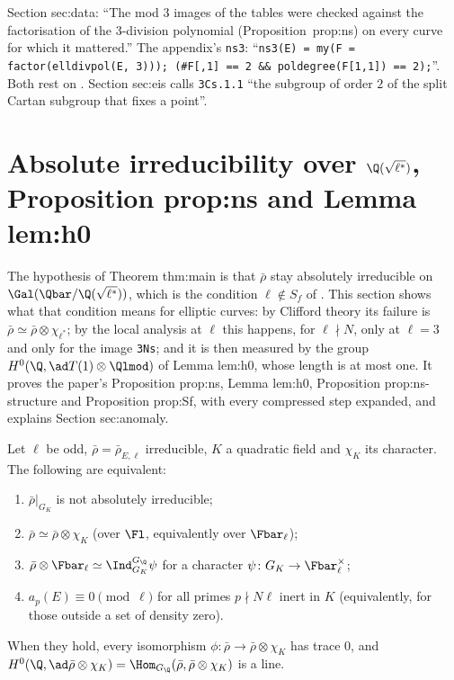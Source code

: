 \begin{paperlink}
Section sec:data: ``The mod $3$ images of the tables were checked against the factorisation of the $3$-division polynomial (Proposition~prop:ns) on every curve for which it mattered.'' The appendix's
\texttt{ns3}: ``\texttt{ns3(E) = my(F = factor(elldivpol(E, 3))); (\#F[,1] == 2 \&\& poldegree(F[1,1]) == 2);}''. Both rest on
. Section sec:eis calls \texttt{3Cs.1.1} ``the subgroup of order $2$ of the split Cartan subgroup that fixes a point''.
\end{paperlink}

\section[Absolute irreducibility over \texorpdfstring{$\Q(\sqrt{\ell^*})$}{Q(sqrt l*)}]{Absolute irreducibility over \texorpdfstring{$\Q(\sqrt{\ell^*})$}{Q(sqrt l*)}, Proposition prop:ns and Lemma lem:h0}\label{sec:galrep:lstar}

The hypothesis of Theorem thm:main is that $\bar\rho$ stay absolutely irreducible on $\Gal(\Qbar/\Q(\sqrt{\ell^*}))$, which is the condition $\ell\notin S_f$ of
\cite[(31)]{DFG04}. This section shows what that condition means for elliptic curves: by Clifford theory its failure is $\bar\rho\simeq\bar\rho\otimes\chi_{\ell^*}$; by the
local analysis at $\ell$ this happens, for $\ell\nmid N$, only at $\ell=3$ and only for the image \texttt{3Ns}; and it is then measured by the group
$H^0(\Q,\ad T(1)\otimes\Qlmod)$ of Lemma lem:h0, whose length is at most one. It proves the paper's Proposition prop:ns, Lemma lem:h0, Proposition
prop:ns-structure and Proposition prop:Sf, with every compressed step expanded, and explains Section sec:anomaly.

\begin{proposition}\label{prop:galrep:dihedral}
Let $\ell$ be odd, $\bar\rho=\bar\rho_{E,\ell}$ irreducible, $K$ a quadratic field and $\chi_K$ its character. The following are equivalent:
\begin{enumerate}[label=(\alph*)]
\item $\bar\rho|_{G_K}$ is not absolutely irreducible;
\item $\bar\rho\simeq\bar\rho\otimes\chi_K$ (over $\Fl$, equivalently over $\Fbar_\ell$);
\item $\bar\rho\otimes\Fbar_\ell\simeq\Ind_{G_K}^{G_\Q}\psi$ for a character $\psi\colon G_K\to\Fbar_\ell^\times$;
\item $a_p(E)\equiv0\pmod\ell$ for all primes $p\nmid N\ell$ inert in $K$ (equivalently, for those outside a set of density zero).
\end{enumerate}
When they hold, every isomorphism $\phi\colon\bar\rho\to\bar\rho\otimes\chi_K$ has trace $0$, and $H^0(\Q,\ad\bar\rho\otimes\chi_K)=\Hom_{G_\Q}(\bar\rho,\bar\rho\otimes\chi_K)$ is a line.
\end{proposition}

